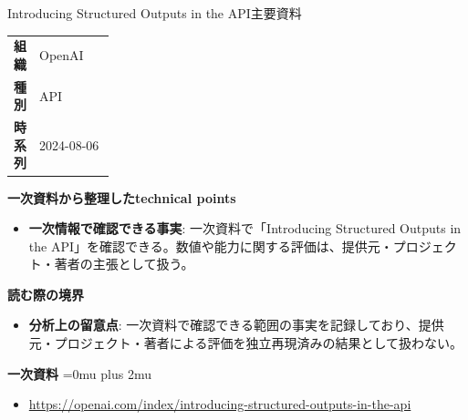 \begin{technicalnote}{Introducing Structured Outputs in the API}{主要資料}
\begingroup
\begin{tabularx}{\linewidth}{@{}>{\bfseries}p{0.22\linewidth}X@{}}
組織 & OpenAI \\
種別 & API \\
時系列 & 2024-08-06 \\
\end{tabularx}
\smallskip
{\bfseries 一次資料から整理したtechnical points}
\begin{itemize}[leftmargin=1.5em,itemsep=0.35em]
\item \textbf{一次情報で確認できる事実}: 一次資料で「Introducing Structured Outputs in the API」を確認できる。数値や能力に関する評価は、提供元・プロジェクト・著者の主張として扱う。
\end{itemize}
\begin{minipage}{\linewidth}
{\bfseries 読む際の境界}
\begin{itemize}[leftmargin=1.5em,itemsep=0.35em]
\item \textbf{分析上の留意点}: 一次資料で確認できる範囲の事実を記録しており、提供元・プロジェクト・著者による評価を独立再現済みの結果として扱わない。
\end{itemize}
\begin{samepage}
{\bfseries 一次資料}
\begingroup\sloppy
\Urlmuskip=0mu plus 2mu\relax
\begin{itemize}[leftmargin=1.5em,itemsep=0.25em]
\item {\scriptsize\url{https://openai.com/index/introducing-structured-outputs-in-the-api}}
\end{itemize}
\endgroup
\end{samepage}
\end{minipage}
\endgroup
\end{technicalnote}
\medskip

